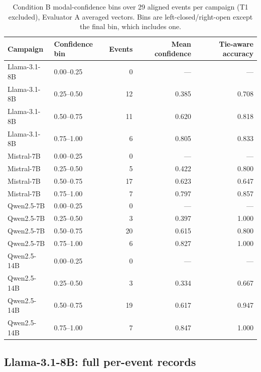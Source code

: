 \begin{table}[!htbp]
\centering\small
\caption{Condition B modal-confidence bins over 29 aligned events per campaign (T1 excluded), Evaluator A averaged vectors. Bins are left-closed/right-open except the final bin, which includes one.}
\label{tab:full_calibration}
\begin{tabular}{llrrr}
\toprule
Campaign & Confidence bin & Events & Mean confidence & Tie-aware accuracy \\
\midrule
Llama-3.1-8B & 0.00--0.25 & 0 & --- & --- \\
Llama-3.1-8B & 0.25--0.50 & 12 & 0.385 & 0.708 \\
Llama-3.1-8B & 0.50--0.75 & 11 & 0.620 & 0.818 \\
Llama-3.1-8B & 0.75--1.00 & 6 & 0.805 & 0.833 \\
Mistral-7B & 0.00--0.25 & 0 & --- & --- \\
Mistral-7B & 0.25--0.50 & 5 & 0.422 & 0.800 \\
Mistral-7B & 0.50--0.75 & 17 & 0.623 & 0.647 \\
Mistral-7B & 0.75--1.00 & 7 & 0.797 & 0.857 \\
Qwen2.5-7B & 0.00--0.25 & 0 & --- & --- \\
Qwen2.5-7B & 0.25--0.50 & 3 & 0.397 & 1.000 \\
Qwen2.5-7B & 0.50--0.75 & 20 & 0.615 & 0.800 \\
Qwen2.5-7B & 0.75--1.00 & 6 & 0.827 & 1.000 \\
Qwen2.5-14B & 0.00--0.25 & 0 & --- & --- \\
Qwen2.5-14B & 0.25--0.50 & 3 & 0.334 & 0.667 \\
Qwen2.5-14B & 0.50--0.75 & 19 & 0.617 & 0.947 \\
Qwen2.5-14B & 0.75--1.00 & 7 & 0.847 & 1.000 \\
\bottomrule
\end{tabular}
\end{table}


\clearpage\subsection{Llama-3.1-8B: full per-event records}

